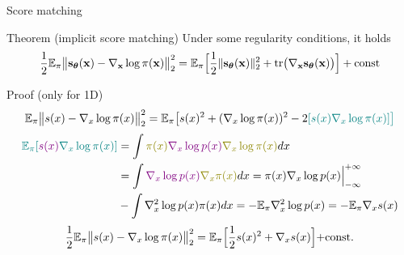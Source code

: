 \begin{frame}{Score matching}
	\begin{block}{Theorem (implicit score matching)}
		Under some regularity conditions, it holds
		\vspace{-0.2cm}
		\[
		\frac{1}{2} \mathbb{E}_{\pi}\bigl\| \mathbf{s}_{\boldsymbol{\theta}}(\mathbf{x}) - \nabla_{\mathbf{x}} \log \pi(\mathbf{x}) \bigr\|^2_2 = \mathbb{E}_{\pi}\Bigr[ \frac{1}{2}\| \mathbf{s}_{\boldsymbol{\theta}}(\mathbf{x}) \|_2^2 + \text{tr}\bigl(\nabla_{\mathbf{x}} \mathbf{s}_{\boldsymbol{\theta}}(\mathbf{x})\bigr) \Bigr] + \text{const}
		\]
		\vspace{-0.6cm}
	\end{block}
	\begin{block}{Proof (only for 1D)}
		\vspace{-0.6cm}
		{\small
			\begin{multline*}
				\mathbb{E}_{\pi}\bigl\| s(x) - \nabla_x \log \pi(x) \bigr\|^2_2 = \mathbb{E}_{\pi} \bigl[ s(x)^2 + (\nabla_x \log \pi(x))^2 - 2{\color{teal}[s(x) \nabla_x \log \pi(x) ] \bigr] }
			\end{multline*}
			\vspace{-0.8cm}
			\begin{align*}
				{\color{teal}\bbE_{\pi} [{\color{violet}s(x) } \nabla_x \log \pi(x) ] } &= \int {\color{olive}\pi(x) {\color{violet}\nabla_x \log p(x)} \nabla_x \log \pi(x)} d x \\ 
				&= \int {\color{violet}\nabla_x \log p(x) } {\color{olive}\nabla_x \pi(x) } dx = \Bigl.\pi(x) \nabla_x \log p(x) \Bigr|_{-\infty}^{+\infty} \\
				&- \int \nabla^2_x \log p(x)  \pi(x) dx =- \bbE_{\pi} \nabla^2_x \log p(x) =- \bbE_{\pi} \nabla_x s(x)
			\end{align*}
			\[
			\frac{1}{2} \mathbb{E}_{\pi}\bigl\| s(x) - \nabla_x \log \pi(x) \bigr\|^2_2 = \mathbb{E}_{\pi} \Bigr[\frac{1}{2} s(x)^2 + \nabla_x s(x) \Bigl]+ \text{const}.
			\]
		}
	\end{block}
\end{frame}
